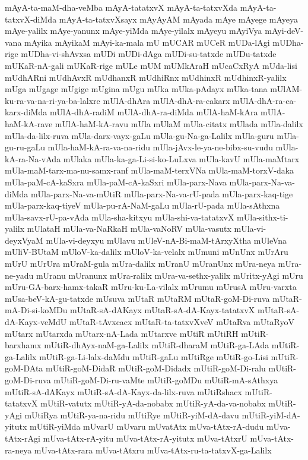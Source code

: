 {mAyA-ta-maM-dha-veMba
mAyA-tatatxvX
mAyA-ta-tatxvXda
mAyA-ta-tatxvX-diMda
mAyA-ta-tatxvXsayx
mAyAyAM
mAyada
mAye
mAyege
mAyeya
mAye-yalilx
mAye-yanunx
mAye-yiMda
mAye-yilalx
mAyeyu
mAyiVya
mAyi-deV-vana
mAyika
mAyikaM
mAyi-ka-mala
mU
mUCAR
mUCeR
mUDa-lAgi
mUDha-rige
mUDha-vi-shAvxsa
mUDi
mUDi-dAga
mUDi-su-tatxde
mUDu-tatxde
mUKaR-nA-gali
mUKaR-rige
mULe
mUM
mUMkAraH
mUcaCxRyA
mUda-lisi
mUdhARni
mUdhAvxR
mUdhanxR
mUdhiRnx
mUdhinxR
mUdhinxR-yalilx
mUga
mUgage
mUgige
mUgina
mUgu
mUka
mUka-pAdayx
mUka-tana
mUlAM-ku-ra-va-na-ri-ya-ba-lalxre
mUlA-dhAra
mUlA-dhA-ra-cakarx
mUlA-dhA-ra-ca-karx-diMda
mUlA-dhA-radiM
mUlA-dhA-ra-diMda
mUlA-haM-kAra
mUlA-haM-kA-rave
mUlA-haM-kA-ravu
mUla
mUlaM
mUla-citatx
mUlada
mUla-dalilx
mUla-da-lilx-ruva
mUla-darx-vayx-gaLu
mUla-gu-Na-ga-Lalilx
mUla-guru
mUla-gu-ru-gaLu
mUla-haM-kA-ra-va-na-ridu
mUla-jAvx-le-ya-ne-bibx-su-vudu
mUla-kA-ra-Na-vAda
mUlaka
mUla-ka-ga-Li-si-ko-LuLxva
mUla-kavU
mUla-maMtarx
mUla-maM-tarx-ma-nu-samx-ranf
mUla-maM-terxVNa
mUla-maM-torxV-daka
mUla-paM-cA-kaSxra
mUla-paM-cA-kaSxri
mUla-parx-Nava
mUla-parx-Na-va-diMda
mUla-parx-Na-va-mUtiR
mUla-parx-Na-va-rU-pada
mUla-parx-kaq-tige
mUla-parx-kaq-tiyeV
mUla-pu-rA-NaM-gaLu
mUla-rU-pada
mUla-sAthxna
mUla-savx-rU-pa-vAda
mUla-sha-kitxyu
mUla-shi-va-tatatxvX
mUla-sithx-ti-yalilx
mUlataH
mUla-va-NaRkaH
mUla-vaNoRV
mUla-vasutx
mUla-vi-deyxVyaM
mUla-vi-deyxyu
mUlavu
mUleV-nA-Bi-maM-tArxyXtha
mUleVna
mUliV-BUtaM
mUloV-ka-dalilx
mUloV-ka-velalx
mUmuni
mUnUnx
mUrAru
mUrU
mUrUra
mUraM-gula
mUra-dalilx
mUranU
mUranUnx
mUra-neya
mUra-ne-yadu
mUranu
mUranunx
mUra-ralilx
mUra-va-sethx-yalilx
mUritx-yAgi
mUru
mUru-GA-barx-hamx-takaR
mUru-ku-La-vilalx
mUrumu
mUrusA
mUru-varxta
mUsa-beV-kA-gu-tatxde
mUsuva
mUtaR
mUtaRM
mUtaR-goM-Di-ruva
mUtaR-mA-Di-si-koMDu
mUtaR-sA-dAKayx
mUtaR-sA-dA-Kayx-tatatxvX
mUtaR-sA-dA-Kayx-veMdU
mUtaR-tAvxcacx
mUtaR-ta-tatxvXveV
mUtaRva
mUtaRyoV
mUtarx
mUtarxda
mUtarx-nA-Lada
mUtarxve
mUtiR
mUtiRH
mUtiR-barxhamx
mUtiR-dhAyx-naM-ga-Lalilx
mUtiR-dharaM
mUtiR-ga-LAda
mUtiR-ga-Lalilx
mUtiR-ga-Li-lalx-daMdu
mUtiR-gaLu
mUtiRge
mUtiR-go-Lisi
mUtiR-goM-DAta
mUtiR-goM-DidaR
mUtiR-goM-Didadx
mUtiR-goM-Di-ralu
mUtiR-goM-Di-ruva
mUtiR-goM-Di-ru-vaMte
mUtiR-goMDu
mUtiR-mA-sAthxya
mUtiR-sA-dAKayx
mUtiR-sA-dA-Kayx-da-lilx-ruva
mUtiRshacx
mUtiR-tatatxvX
mUtiR-vatutx
mUtiR-yA-da-nobabx
mUtiR-yA-da-va-nobabx
mUtiR-yAgi
mUtiRya
mUtiR-ya-na-ridu
mUtiRye
mUtiR-yiM-dA-davu
mUtiR-yiM-dA-yitutx
mUtiR-yiMda
mUvarU
mUvaru
mUvatAtx
mUva-tAtx-rA-dudu
mUva-tAtx-rAgi
mUva-tAtx-rA-yitu
mUva-tAtx-rA-yitutx
mUva-tAtxrU
mUva-tAtx-ra-neya
mUva-tAtx-rara
mUva-tAtxru
mUva-tAtx-ru-ta-tatxvX-ga-Lalilx
}
